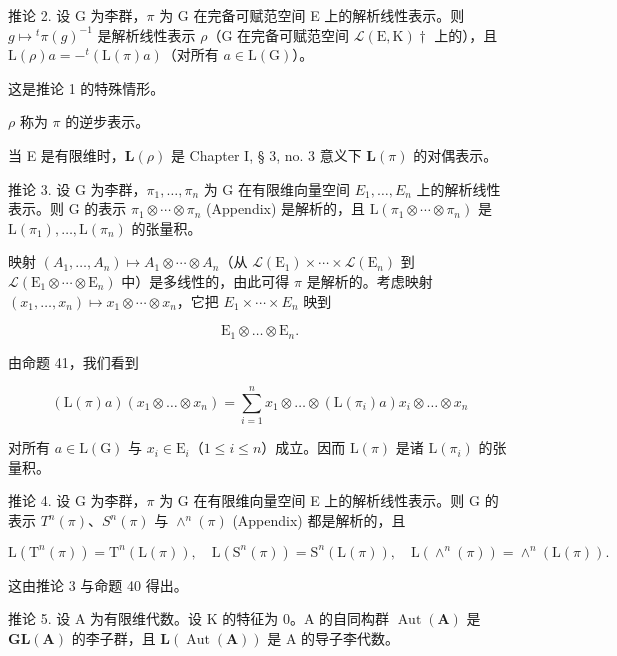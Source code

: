 推论 2. 设 G 为李群，\(\pi\) 为 G 在完备可赋范空间 E 上的解析线性表示。则 \(g \mapsto {}^{t}\pi(g)^{-1}\) 是解析线性表示 \(\rho\)（G 在完备可赋范空间 \(\mathcal{L}(\mathrm{E}, \mathrm{K})\dagger\) 上的），且 \(\mathrm{L}(\rho)a = -{}^{t}(\mathrm{L}(\pi)a)\)（对所有 \(a \in \mathrm{L}(\mathrm{G})\)）。

这是推论 1 的特殊情形。

\(\rho\) 称为 \(\pi\) 的逆步表示。

当 E 是有限维时，\(\mathbf{L}(\rho)\) 是 Chapter I, § 3, no. 3 意义下 \(\mathbf{L}(\pi)\) 的对偶表示。

推论 3. 设 G 为李群，\(\pi_1, \ldots, \pi_n\) 为 G 在有限维向量空间 \(E_{1},\ldots,E_{n}\) 上的解析线性表示。则 G 的表示 \(\pi_{1}\otimes\cdots\otimes\pi_{n}\) (Appendix) 是解析的，且 \(\mathrm{L}(\pi_{1}\otimes\cdots\otimes\pi_{n})\) 是 \(\mathrm{L}(\pi_{1}),\ldots,\mathrm{L}(\pi_{n})\) 的张量积。

映射 \((A_{1},\ldots,A_{n})\mapsto A_{1}\otimes\cdots\otimes A_{n}\)（从 \(\mathcal{L}(\mathrm{E}_{1})\times\cdots\times\mathcal{L}(\mathrm{E}_{n})\) 到 \(\mathcal{L}(\mathrm{E}_{1}\otimes\cdots\otimes\mathrm{E}_{n})\) 中）是多线性的，由此可得 \(\pi\) 是解析的。考虑映射 \((x_{1},\ldots,x_{n})\mapsto x_{1}\otimes\cdots\otimes x_{n}\)，它把 \(E_{1}\times\cdots\times E_{n}\) 映到

\[
\mathrm{E} _ {1} \otimes \dots \otimes \mathrm{E} _ {n}.
\]

由命题 41，我们看到

\[
(\mathrm{L} (\pi) a) (x _ {1} \otimes \dots \otimes x _ {n}) = \sum_ {i = 1} ^ {n} x _ {1} \otimes \dots \otimes (\mathrm{L} (\pi_ {i}) a) x _ {i} \otimes \dots \otimes x _ {n}
\]

对所有 \(a \in \mathrm{L}(\mathrm{G})\) 与 \(x_{i} \in \mathrm{E}_{i}\)（\(1 \leqslant i \leqslant n\)）成立。因而 \(\mathrm{L}(\pi)\) 是诸 \(\mathrm{L}(\pi_{i})\) 的张量积。

推论 4. 设 G 为李群，\(\pi\) 为 G 在有限维向量空间 E 上的解析线性表示。则 G 的表示 \(T^{n}(\pi)\)、\(S^{n}(\pi)\) 与 \(\wedge^{n}(\pi)\) (Appendix) 都是解析的，且

\[
\mathrm{L} \left(\mathrm{T} ^ {n} (\pi)\right) = \mathrm{T} ^ {n} (\mathrm{L} (\pi)), \quad \mathrm{L} \left(\mathrm{S} ^ {n} (\pi)\right) = \mathrm{S} ^ {n} (\mathrm{L} (\pi)), \quad \mathrm{L} \left(\wedge^ {n} (\pi)\right) = \wedge^ {n} (\mathrm{L} (\pi)).
\]

这由推论 3 与命题 40 得出。

推论 5. 设 A 为有限维代数。设 K 的特征为 0。A 的自同构群 \(\operatorname{Aut}(\mathbf{A})\) 是 \(\mathbf{GL}(\mathbf{A})\) 的李子群，且 \(\mathbf{L}(\operatorname{Aut}(\mathbf{A}))\) 是 A 的导子李代数。

